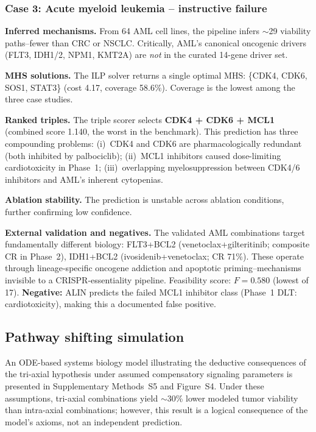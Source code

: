 \documentclass[11pt]{article}
\begin{document}
\subsubsection{Case 3: Acute myeloid leukemia -- instructive failure}

\textbf{Inferred mechanisms.} From 64 AML cell lines, the pipeline infers $\sim$29 viability paths--fewer than CRC or NSCLC. Critically, AML's canonical oncogenic drivers (FLT3, IDH1/2, NPM1, KMT2A) are \emph{not} in the curated 14-gene driver set.

\textbf{MHS solutions.} The ILP solver returns a single optimal MHS: \{CDK4, CDK6, SOS1, STAT3\} (cost 4.17, coverage 58.6\%). Coverage is the lowest among the three case studies.

\textbf{Ranked triples.} The triple scorer selects \textbf{CDK4 + CDK6 + MCL1} (combined score 1.140, the worst in the benchmark). This prediction has three compounding problems: (i)~CDK4 and CDK6 are pharmacologically redundant (both inhibited by palbociclib); (ii)~MCL1 inhibitors caused dose-limiting cardiotoxicity in Phase~1; (iii)~overlapping myelosuppression between CDK4/6 inhibitors and AML's inherent cytopenias.

\textbf{Ablation stability.} The prediction is unstable across ablation conditions, further confirming low confidence.

\textbf{External validation and negatives.} The validated AML combinations target fundamentally different biology: FLT3+BCL2 (venetoclax+gilteritinib; composite CR in Phase~2), IDH1+BCL2 (ivosidenib+venetoclax; CR 71\%). These operate through lineage-specific oncogene addiction and apoptotic priming--mechanisms invisible to a CRISPR-essentiality pipeline. Feasibility score: $F = 0.580$ (lowest of 17). \textbf{Negative:} ALIN predicts the failed MCL1 inhibitor class (Phase~1 DLT: cardiotoxicity), making this a documented false positive.

\subsection{Pathway shifting simulation}
\label{sec:pathway_sim}
An ODE-based systems biology model illustrating the deductive consequences of the tri-axial hypothesis under assumed compensatory signaling parameters is presented in Supplementary Methods~S5 and Figure~S4. Under these assumptions, tri-axial combinations yield $\sim$30\% lower modeled tumor viability than intra-axial combinations; however, this result is a logical consequence of the model's axioms, not an independent prediction.
\end{document}
